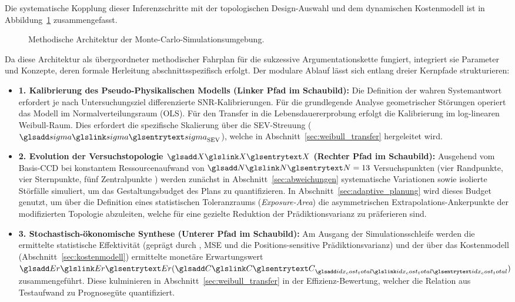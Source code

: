 Die systematische Kopplung dieser Inferenzschritte mit der topologischen Design-Auswahl und dem dynamischen Kostenmodell ist in Abbildung~\ref{fig:mcs_framework} zusammengefasst.
\begin{figure}[htbp]
    \centering
    \def\svgwidth{1\textwidth}
    \small
    
    \caption{Methodische Architektur der Monte-Carlo-Simulationsumgebung.}
    \label{fig:mcs_framework}
\end{figure}
Da diese Architektur als übergeordneter methodischer Fahrplan für die sukzessive Argumentationskette fungiert, integriert sie Parameter und Konzepte, deren formale Herleitung abschnittsspezifisch erfolgt.
Der modulare Ablauf lässt sich entlang dreier Kernpfade strukturieren:
\begin{itemize}
    \item \textbf{1. Kalibrierung des Pseudo-Physikalischen Modells (Linker Pfad im Schaubild):} Die Definition der wahren Systemantwort erfordert je nach Untersuchungsziel differenzierte \ac{SNR}-Kalibrierungen. Für die grundlegende Analyse geometrischer Störungen operiert das Modell im Normalverteilungsraum (\ac{OLS}). Für den Transfer in die Lebensdauererprobung erfolgt die Kalibrierung im log-linearen Weibull-Raum. Dies erfordert die spezifische Skalierung über die \ac{SEV}-Streuung ($\sym{sigma}_{\textnormal{SEV}}$), welche in Abschnitt~\ref{sec:weibull_transfer} hergeleitet wird.
    \item \textbf{2. Evolution der Versuchstopologie $\sym{X}$ (Rechter Pfad im Schaubild):} Ausgehend vom Basis-\ac{CCD} bei konstantem Ressourcenaufwand von $\sym{N} = 13$ Versuchspunkten (vier Randpunkte, vier Sternpunkte, fünf Zentralpunkte \cite{Montgomery.2020,Rigdon.2022}) werden zunächst in Abschnitt~\ref{sec:abweichungen} systematische Variationen sowie isolierte Störfälle simuliert, um das Gestaltungsbudget des Plans zu quantifizieren. In Abschnitt~\ref{sec:adaptive_planung} wird dieses Budget genutzt, um über die Definition eines statistischen Toleranzraums (\textit{Exposure-Area}) die asymmetrischen Extrapolations-Ankerpunkte der modifizierten Topologie abzuleiten, welche für eine gezielte Reduktion der Prädiktionsvarianz zu präferieren sind.
    \item \textbf{3. Stochastisch-ökonomische Synthese (Unterer Pfad im Schaubild):} Am Ausgang der Simulationsschleife werden die ermittelte statistische Effektivität (geprägt durch , \ac{MSE} und die Positions-sensitive Prädiktionsvarianz) und der über das Kostenmodell (Abschnitt~\ref{sec:kostenmodell}) ermittelte monetäre Erwartungswert $\sym{Er}(\sym{C}_{\sym{idx_cost_total}})$ zusammengeführt. Diese kulminieren in Abschnitt~\ref{sec:weibull_transfer} in der Effizienz-Bewertung, welcher die Relation aus Testaufwand zu Prognosegüte quantifiziert.
\end{itemize}



